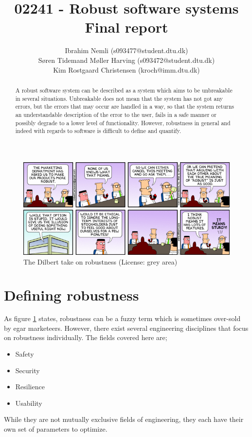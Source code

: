 \documentclass[10pt,a4paper]{article}
\begin{document}
\author{
  Ibrahim Nemli (s093477@student.dtu.dk)\\
  Søren Tidemand Møller Harving (s093472@student.dtu.dk) \\
  Kim Rostgaard Christensen (kroch@imm.dtu.dk)
}
\title{02241 - Robust software systems \\
	Final report
}

\maketitle

\begin{abstract}
A robust software system can be described as a system which aims to be unbreakable in several situations. Unbreakable does not mean that the system has not got any errors, but the errors that may occur are handled in a way, so that the system returns an understandable description of the error to the user, fails in a safe manner or possibly degrade to a lower level of functionality. However, robustness in general and indeed with regards to software is difficult to define and quantify.
\end{abstract}

\tableofcontents
\newpage
\begin{figure}[h]
\centering
\includegraphics[scale=0.4]{fig/dilbert_robust.png}
 \caption{The Dilbert take on robustness (License: grey area)}
 \label{fig:dilber_robustness}
\end{figure}


\section{Defining robustness}
As figure \ref{fig:dilber_robustness} states, robustness can be a fuzzy term which is sometimes over-sold by egar marketeers.
However, there exist several engineering disciplines that focus on robustness individually. The fields covered here are;
\begin{itemize}
\item Safety
\item Security
\item Resilience
\item Usability
\end{itemize}
While they are not mutually exclusive fields of engineering, they each have their own set of parameters to optimize.
\end{document}
